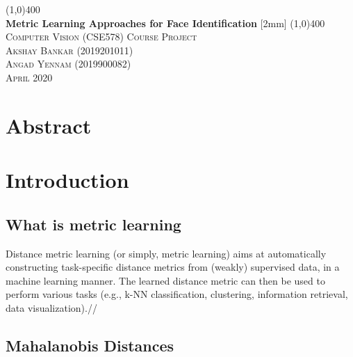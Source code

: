 \documentclass{article}
\begin{document}
\begin{titlepage}
    \begin{center}
        \line(1,0){400}\\
        [0.25in]
        \huge{\bfseries Metric Learning Approaches for Face Identification}
        [2mm]
        \line(1,0){400}\\
        [0.25in]
        \textsc{\large Computer Vision (CSE578) Course Project}\\
        [3mm]
        \textsc{\large Akshay Bankar (2019201011) \\
                Angad Yennam (2019900082) } \\
        \textsc{\large April 2020}
    \end{center}

\end{titlepage}

\tableofcontents
\thispagestyle{empty}
\cleardoublepage
\setcounter{page}{1}

\listoffigures
{}
\cleardoublepage

\listoftables
{}
\cleardoublepage

\section*{Abstract}
\cleardoublepage



\section{Introduction}\label{sec:intro}
\subsection{What is metric learning}
Distance metric learning (or simply, metric learning) aims at automatically constructing task-specific distance metrics from (weakly) supervised data, in a machine learning manner. The learned distance metric can then be used to perform various tasks (e.g., k-NN classification, clustering, information retrieval, data visualization).//

\subsection{Mahalanobis Distances}
\end{document}
